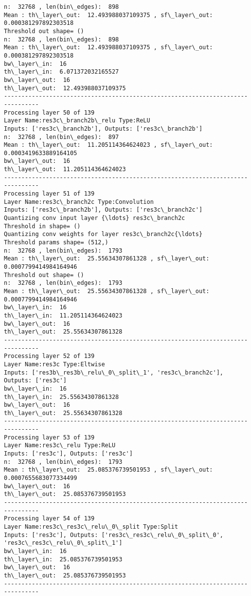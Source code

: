 \documentclass[11pt]{article}
\begin{document}
\begin{Verbatim}[commandchars=\\\{\}]
n:  32768 , len(bin\_edges):  898
Mean : th\_layer\_out:  12.493988037109375 , sf\_layer\_out:  0.000381297892303518
Threshold out shape= ()
n:  32768 , len(bin\_edges):  898
Mean : th\_layer\_out:  12.493988037109375 , sf\_layer\_out:  0.000381297892303518
bw\_layer\_in:  16
th\_layer\_in:  6.071372032165527
bw\_layer\_out:  16
th\_layer\_out:  12.493988037109375
--------------------------------------------------------------------------------
Processing layer 50 of 139
Layer Name:res3c\_branch2b\_relu Type:ReLU
Inputs: ['res3c\_branch2b'], Outputs: ['res3c\_branch2b']
n:  32768 , len(bin\_edges):  897
Mean : th\_layer\_out:  11.205114364624023 , sf\_layer\_out:  0.0003419633889164105
bw\_layer\_out:  16
th\_layer\_out:  11.205114364624023
--------------------------------------------------------------------------------
Processing layer 51 of 139
Layer Name:res3c\_branch2c Type:Convolution
Inputs: ['res3c\_branch2b'], Outputs: ['res3c\_branch2c']
Quantizing conv input layer {\ldots} res3c\_branch2c
Threshold in shape= ()
Quantizing conv weights for layer res3c\_branch2c{\ldots}
Threshold params shape= (512,)
n:  32768 , len(bin\_edges):  1793
Mean : th\_layer\_out:  25.55634307861328 , sf\_layer\_out:  0.0007799414984164946
Threshold out shape= ()
n:  32768 , len(bin\_edges):  1793
Mean : th\_layer\_out:  25.55634307861328 , sf\_layer\_out:  0.0007799414984164946
bw\_layer\_in:  16
th\_layer\_in:  11.205114364624023
bw\_layer\_out:  16
th\_layer\_out:  25.55634307861328
--------------------------------------------------------------------------------
Processing layer 52 of 139
Layer Name:res3c Type:Eltwise
Inputs: ['res3b\_res3b\_relu\_0\_split\_1', 'res3c\_branch2c'], Outputs: ['res3c']
bw\_layer\_in:  16
th\_layer\_in:  25.55634307861328
bw\_layer\_out:  16
th\_layer\_out:  25.55634307861328
--------------------------------------------------------------------------------
Processing layer 53 of 139
Layer Name:res3c\_relu Type:ReLU
Inputs: ['res3c'], Outputs: ['res3c']
n:  32768 , len(bin\_edges):  1793
Mean : th\_layer\_out:  25.085376739501953 , sf\_layer\_out:  0.0007655683077334499
bw\_layer\_out:  16
th\_layer\_out:  25.085376739501953
--------------------------------------------------------------------------------
Processing layer 54 of 139
Layer Name:res3c\_res3c\_relu\_0\_split Type:Split
Inputs: ['res3c'], Outputs: ['res3c\_res3c\_relu\_0\_split\_0', 'res3c\_res3c\_relu\_0\_split\_1']
bw\_layer\_in:  16
th\_layer\_in:  25.085376739501953
bw\_layer\_out:  16
th\_layer\_out:  25.085376739501953
--------------------------------------------------------------------------------

\end{Verbatim}
\end{document}
